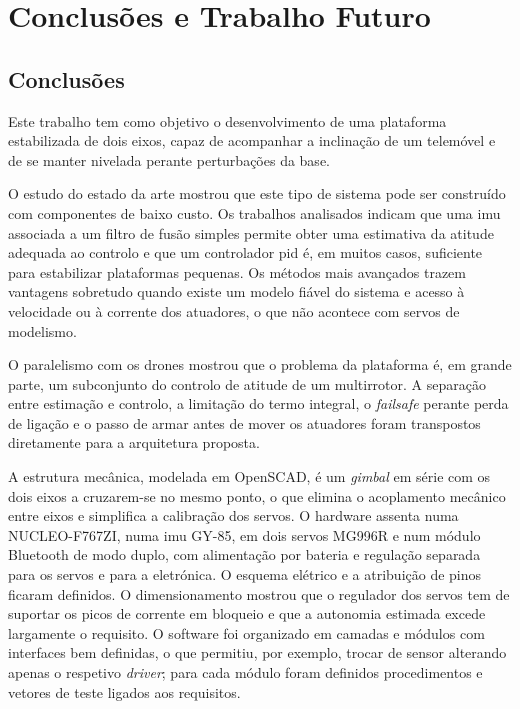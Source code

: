 \chapter{Conclusões e Trabalho Futuro}
\label{ch:conclusao}

\section{Conclusões}
Este trabalho tem como objetivo o desenvolvimento de uma plataforma estabilizada de dois eixos, capaz de acompanhar a inclinação de um telemóvel e de se manter nivelada perante perturbações da base.

O estudo do estado da arte mostrou que este tipo de sistema pode ser construído com componentes de baixo custo. Os trabalhos analisados indicam que uma \gls{imu} associada a um filtro de fusão simples permite obter uma estimativa da atitude adequada ao controlo e que um controlador \gls{pid} é, em muitos casos, suficiente para estabilizar plataformas pequenas. Os métodos mais avançados trazem vantagens sobretudo quando existe um modelo fiável do sistema e acesso à velocidade ou à corrente dos atuadores, o que não acontece com servos de modelismo.

O paralelismo com os drones mostrou que o problema da plataforma é, em grande parte, um subconjunto do controlo de atitude de um multirrotor. A separação entre estimação e controlo, a limitação do termo integral, o \textit{failsafe} perante perda de ligação e o passo de armar antes de mover os atuadores foram transpostos diretamente para a arquitetura proposta.

A estrutura mecânica, modelada em OpenSCAD, é um \textit{gimbal} em série com os dois eixos a cruzarem-se no mesmo ponto, o que elimina o acoplamento mecânico entre eixos e simplifica a calibração dos servos. O hardware assenta numa NUCLEO-F767ZI, numa \gls{imu} GY-85, em dois servos MG996R e num módulo Bluetooth de modo duplo, com alimentação por bateria e regulação separada para os servos e para a eletrónica. O esquema elétrico e a atribuição de pinos ficaram definidos. O dimensionamento mostrou que o regulador dos servos tem de suportar os picos de corrente em bloqueio e que a autonomia estimada excede largamente o requisito. O software foi organizado em camadas e módulos com interfaces bem definidas, o que permitiu, por exemplo, trocar de sensor alterando apenas o respetivo \textit{driver}; para cada módulo foram definidos procedimentos e vetores de teste ligados aos requisitos.


